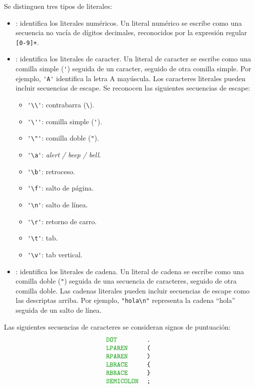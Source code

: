 Se distinguen tres tipos de literales:
\begin{itemize}
\item
  : identifica los literales numéricos.
  Un literal numérico se escribe como una secuencia no vacía
  de dígitos decimales, reconocidos por la expresión regular \verb|[0-9]+|.
\item
  : identifica los literales de caracter.
  Un literal de caracter se escribe como una comilla simple (\verb|'|)
  seguida de un caracter, seguido de otra comilla simple.
  Por ejemplo, \verb|'A'| identifica la letra A mayúscula.
  Los caracteres literales pueden incluir secuencias de escape.
  Se reconocen las siguientes secuencias de escape:
  \begin{itemize}
  \item[] \verb|'\\'|: contrabarra (\verb|\|).
  \item[] \verb|'\''|: comilla simple (\verb|'|).
  \item[] \verb|'\"'|: comilla doble (\verb|"|).
  \item[] \verb|'\a'|: {\em alert / beep / bell}.
  \item[] \verb|'\b'|: retroceso.
  \item[] \verb|'\f'|: salto de página.
  \item[] \verb|'\n'|: salto de línea.
  \item[] \verb|'\r'|: retorno de carro.
  \item[] \verb|'\t'|: tab.
  \item[] \verb|'\v'|: tab vertical.
  \end{itemize}
\item
  : identifica los literales de cadena.
  Un literal de cadena se escribe como una comilla doble (\verb|"|)
  seguida de una secuencia de caracteres, seguido de otra comilla doble.
  Las cadenas literales pueden incluir secuencias de escape
  como las descriptas arriba.
  Por ejemplo, \verb|"hola\n"| representa la cadena ``hola'' seguida
  de un salto de línea.
\end{itemize}


Las siguientes secuencias de caracteres
se consideran signos de puntuación:
\[
\begin{tabular}{ll}
  \token{DOT}       & \verb|.| \\
  \token{LPAREN}    & \verb|(| \\
  \token{RPAREN}    & \verb|)| \\
  \token{LBRACE}    & \verb|{| \\
  \token{RBRACE}    & \verb|}| \\
  \token{SEMICOLON} & \verb|;| \\
\end{tabular}
\]

